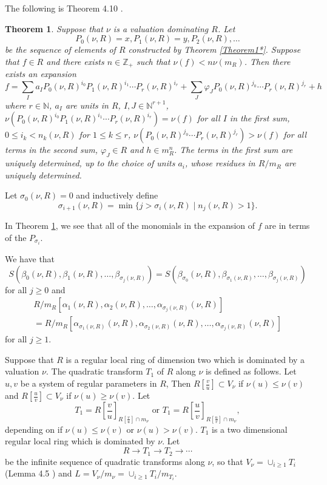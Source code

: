 \documentclass[11pt]{amsart}
\def\NZQ{\mathbb}               %
\def\NN{{\NZQ N}}
\def\ZZ{{\NZQ Z}}
\newtheorem{Theorem}{Theorem}[section]
\let\phi=\varphi
\begin{document}
The following is Theorem 4.10 \cite{CV1}.

\begin{Theorem}\label{TheoremG2} 
Suppose that $\nu$ is a valuation dominating $R$.
Let 
$$
P_0(\nu,R)=x, P_1(\nu,R)=y, P_2(\nu,R),\ldots
$$
be the sequence of elements of $R$ constructed by  Theorem \ref{Theorem1*}.  Suppose that $f\in R$  and there exists $n\in\ZZ_+$ such that $\nu(f)<n\nu(m_R)$. 
Then there exists an expansion 
$$
f=\sum_{I}a_IP_0(\nu,R)^{i_0}P_1(\nu,R)^{i_1}\cdots P_r(\nu,R)^{i_r}+\sum_J\phi_JP_0(\nu,R)^{j_0}\cdots P_r(\nu,R)^{j_r}+h
$$
where $r\in\NN$, $a_{I}$ are units in $R$, $I,J\in \NN^{r+1}$, $\nu(P_0(\nu,R)^{i_0}P_1(\nu,R)^{i_1}\cdots P_r(\nu,R)^{i_r})=\nu(f)$ for all $I$ in the first sum,  $0\le i_k<n_k(\nu,R)$ for $1\le k\le r$, $\nu(P_0(\nu,R)^{j_0}\cdots P_r(\nu,R)^{j_r})>\nu(f)$ for all terms in the second sum, $\phi_J\in R$ and $h\in  m_R^n$.
The terms in the first sum are uniquely determined, up to the choice of units $a_i$, whose residues in $R/m_R$ are uniquely determined.
\end{Theorem}


 
 
 Let $\sigma_0(\nu,R)=0$ and inductively define 
 \begin{equation}\label{eq3}
 \sigma_{i+1}(\nu,R)=\min\{j>\sigma_i(\nu,R)\mid n_j(\nu,R)>1\}.
 \end{equation}
 
 In Theorem \ref{TheoremG2}, we see that all of the monomials in the expansion of $f$ are in terms of the $P_{\sigma_i}$.
 
 We have that
 $$
 S(\beta_0(\nu,R),\beta_1(\nu,R),\ldots,\beta_{\sigma_j(\nu,R)})=S(\beta_{\sigma_0}(\nu,R),\beta_{\sigma_1(\nu,R)},\ldots,\beta_{\sigma_j(\nu,R)})
 $$
for all $j\ge 0$ and
$$
\begin{array}{l}
R/m_R[\alpha_1(\nu,R),\alpha_2(\nu,R),\ldots,\alpha_{\sigma_j(\nu,R)}(\nu,R)]\\
=R/m_R[\alpha_{\sigma_1(\nu,R)}(\nu,R),\alpha_{\sigma_2(\nu,R)}(\nu,R),\ldots,\alpha_{\sigma_j(\nu,R)}(\nu,R)]
\end{array}
$$
for all $j\ge 1$.





Suppose that $R$ is a regular local ring of dimension two which is dominated by a valuation $\nu$. The quadratic transform $T_1$ of $R$ along $\nu$ is defined as follows. Let $u,v$ be a system of regular parameters in $R$,
 Then $R[\frac{v}{u}]\subset V_{\nu}$ if $\nu(u)\le \nu(v)$ and $R[\frac{u}{v}]\subset V_{\nu}$ if $\nu(u)\ge \nu(v)$. Let 
$$
T_1=R\left[\frac{v}{u}\right]_{R[\frac{v}{u}]\cap  m_{\nu}}\mbox{ or }T_1=R\left[\frac{u}{v}\right]_{R[\frac{u}{v}]\cap  m_{\nu}},
$$
depending on if $\nu(u)\le\nu(v)$ or $\nu(u)>\nu(v)$.
$T_1$ is a two dimensional regular local ring which is dominated by $\nu$. 
Let
\begin{equation}\label{eqX3}
R\rightarrow T_1\rightarrow T_2\rightarrow \cdots
\end{equation}
be the infinite sequence of quadratic transforms along $\nu$, so that $V_{\nu}=\cup_{i\ge 1} T_i$ (Lemma 4.5 \cite{RTM}) and $L=V_{\nu}/m_{\nu}=\cup_{i\ge 1} T_i/m_{T_i}$.
\end{document}
